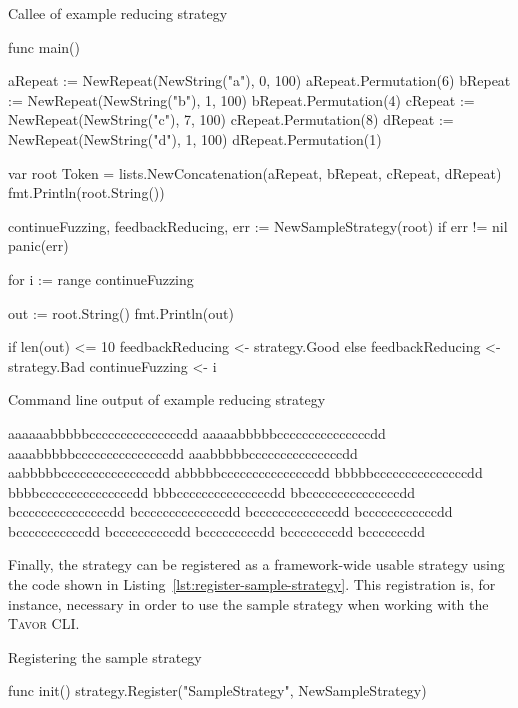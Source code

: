 \begin{listing}[ht]
\caption{Callee of example reducing strategy}
\label{lst:callee-reduce-const-string-repetitions}
\begin{gocode}
func main() {
	aRepeat := NewRepeat(NewString("a"), 0, 100)
	aRepeat.Permutation(6)
	bRepeat := NewRepeat(NewString("b"), 1, 100)
	bRepeat.Permutation(4)
	cRepeat := NewRepeat(NewString("c"), 7, 100)
	cRepeat.Permutation(8)
	dRepeat := NewRepeat(NewString("d"), 1, 100)
	dRepeat.Permutation(1)

	var root Token = lists.NewConcatenation(aRepeat, bRepeat, cRepeat, dRepeat)
	fmt.Println(root.String())

	continueFuzzing, feedbackReducing, err := NewSampleStrategy(root)
	if err != nil { panic(err) }

	for i := range continueFuzzing {
		out := root.String()
		fmt.Println(out)

		if len(out) <= 10 {
			feedbackReducing <- strategy.Good
		} else {
			feedbackReducing <- strategy.Bad
		}
		continueFuzzing <- i
	}
}
\end{gocode}
\end{listing}

\begin{listing}[ht]
\caption{Command line output of example reducing strategy}
\label{lst:output-reduce-const-string-repetitions}
\begin{gocode}
aaaaaabbbbbcccccccccccccccdd
aaaaabbbbbcccccccccccccccdd
aaaabbbbbcccccccccccccccdd
aaabbbbbcccccccccccccccdd
aabbbbbcccccccccccccccdd
abbbbbcccccccccccccccdd
bbbbbcccccccccccccccdd
bbbbcccccccccccccccdd
bbbcccccccccccccccdd
bbcccccccccccccccdd
bcccccccccccccccdd
bccccccccccccccdd
bcccccccccccccdd
bccccccccccccdd
bcccccccccccdd
bccccccccccdd
bcccccccccdd
bccccccccdd
bcccccccdd
\end{gocode}
\end{listing}

Finally, the strategy can be registered as a framework-wide usable strategy using the code shown in Listing~\ref{lst:register-sample-strategy}. This registration is, for instance, necessary in order to use the sample strategy when working with the \textsc{Tavor CLI}.

\begin{listing}[ht]
\caption{Registering the sample strategy}
\label{lst:register-sample-strategy}
\begin{gocode}
func init() {
	strategy.Register("SampleStrategy", NewSampleStrategy)
}
\end{gocode}
\end{listing}

